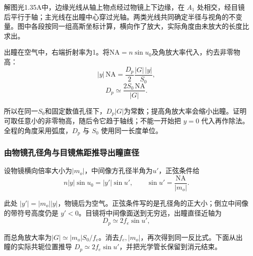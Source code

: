 \documentclass[UTF8,fontset=fandol,a4paper,11pt]{ctexart}
\begin{document}
解图光1.35A中，边缘光线从轴上物点经过物镜上下边缘，在 $A_1$ 处相交，经目镜后平行于轴；主光线在出瞳中心穿过光轴。两类光线共同确定半径与视角的不变量。图中各段按同一组高斯坐标计算，横向作了放大，实际角度由未放大的长度比求出。

出瞳在空气中，右端折射率为1。将$\mathrm{NA}=n\sin u_0$及角放大率代入，约去非零物高：
\[
|y|\,\mathrm{NA}
=\frac{D_p}{2}\frac{|G|\,|y|}{S_0},
\]
\[
\boxed{D_p\simeq\frac{2S_0\,\mathrm{NA}}{|G|}}.
\]

所以在同一$S_0$和固定数值孔径下，$D_p|G|$为常数；提高角放大率会缩小出瞳。证明可取任意小的非零物高，随后令它趋于轴线；不能一开始把 $y=0$ 代入再作除法。全程的角度采用弧度，$D_p$ 与 $S_0$ 使用同一长度单位。

\subsubsection*{由物镜孔径角与目镜焦距推导出瞳直径}
设物镜横向倍率大小为$|m_o|$，中间像方孔径半角为$u'$，正弦条件给
\[
n|y|\sin u_0=|y'|\sin u',
\qquad
\sin u'=\frac{\mathrm{NA}}{|m_o|}.
\]

此处 $|y'|=|m_o||y|$，物镜后为空气。正弦条件写的是孔径角的正大小；倒立中间像的带符号高度仍是 $y'<0$。目镜将中间像面送到无穷远，出瞳直径近轴为
\[
D_p\simeq2f_e\sin u',
\]

而总角放大率为$|G|\simeq |m_o|S_0/f_e$。消去$f_e,|m_o|$，再次得到同一反比式。下面从出瞳的实际共轭位置推导 $D_p\simeq2f_e\sin u'$，并把光学管长保留到消元结束。
\end{document}
